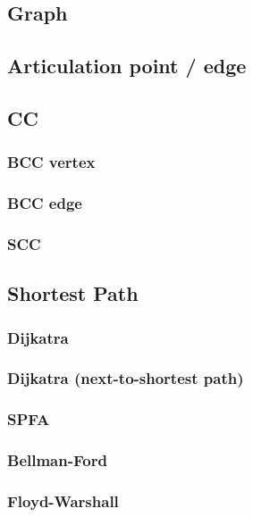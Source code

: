 \documentclass[10pt,oneside]{article}
\begin{document}
\begin{landscape}
\begin{multicols}{2}
\section{Graph}

\subsection{Articulation point / edge}

\subsection{CC}

\subsubsection{BCC vertex}

\subsubsection{BCC edge}

\subsubsection{SCC}

\subsection{Shortest Path}

\subsubsection{Dijkatra}

\subsubsection{Dijkatra (next-to-shortest path)}

\subsubsection{SPFA}

\subsubsection{Bellman-Ford}

\subsubsection{Floyd-Warshall}


\end{multicols}
\end{landscape}
\end{document}
